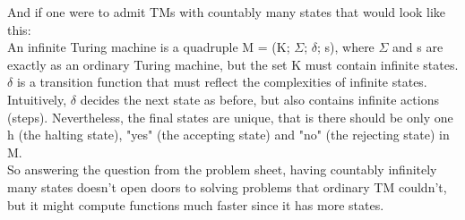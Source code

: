 \documentclass[a4paper]{article}
\begin{document}
And if one were to admit TMs with countably many states that would look like this: \\
An infinite Turing machine is a quadruple M = (K; $ \Sigma $; $ \delta $; s), where $ \Sigma $ and s are exactly as an ordinary Turing machine, but the set K must contain infinite states. $ \delta $ is a transition function that must reflect the complexities of infinite states. Intuitively, $ \delta $ decides the next state as before, but also contains infinite actions (steps). Nevertheless, the final states are unique, that is there should be only one h (the halting state), "yes" (the accepting state) and "no" (the rejecting state) in M. \\

So answering the question from the problem sheet, having countably infinitely many states doesn't open doors to solving problems that ordinary TM couldn't, but it might compute functions much faster since it has more states.
\end{document}
